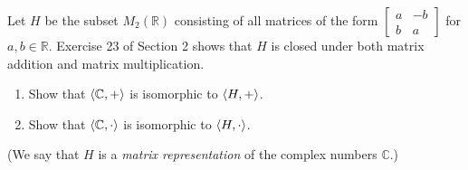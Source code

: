 \begin{exercise}
    Let $H$ be the subset $M_{2}(\mathbb{R})$ consisting of all matrices of the form $\begin{bmatrix}a & -b \\ b & a\end{bmatrix}$ for $a, b\in\mathbb{R}$. Exercise 23 of Section 2 shows that $H$ is closed under both matrix addition and matrix multiplication.
    \begin{enumerate}[label={\textbf{\alph*.}},topsep=0pt,itemsep=0pt]
        \item Show that $\left\langle{\mathbb{C},+}\right\rangle$ is isomorphic to $\left\langle{H,+}\right\rangle$.
        \item Show that $\left\langle{\mathbb{C},\cdot}\right\rangle$ is isomorphic to $\left\langle{H,\cdot}\right\rangle$.
    \end{enumerate}

    (We say that $H$ is a \textit{matrix representation} of the complex numbers $\mathbb{C}$.)
\end{exercise}


